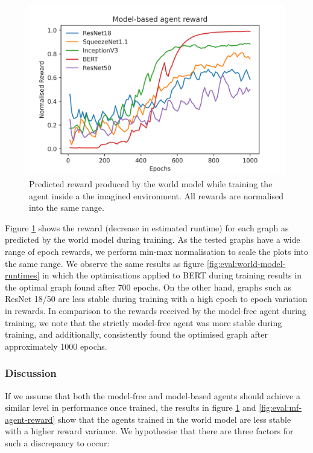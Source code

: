\begin{figure}[h]
  \centering
  \includegraphics[width=1\columnwidth]{sections/5evaluation/images/mb_ctrl_training_reward}
  \caption[Predicted epoch reward during training of agent in world model]{Predicted reward produced by the world model while training the agent inside a the imagined environment. All rewards are normalised into the same range.}
  \label{fig:eval:world-model-pred-reward}
\end{figure}

Figure \ref{fig:eval:world-model-pred-reward} shows the reward (decrease in estimated runtime) for each graph as predicted by the world model during training. As the tested graphs have a wide range of epoch rewards, we perform min-max normalisation to scale the plots into the same range. We observe the same results as figure \ref{fig:eval:world-model-runtimes} in which the optimisations applied to BERT during training results in the optimal graph found after 700 epochs. On the other hand, graphs such as ResNet 18/50 are less stable during training with a high epoch to epoch variation in rewards. In comparison to the rewards received by the model-free agent during training, we note that the strictly model-free agent was more stable during training, and additionally, consistently found the optimised graph after approximately 1000 epochs.

\subsubsection{Discussion}

If we assume that both the model-free and model-based agents should achieve a similar level in performance once trained, the results in figure \ref{fig:eval:world-model-pred-reward} and \ref{fig:eval:mf-agent-reward} show that the agents trained in the world model are less stable with a higher reward variance. We hypothesise that there are three factors for such a discrepancy to occur:

